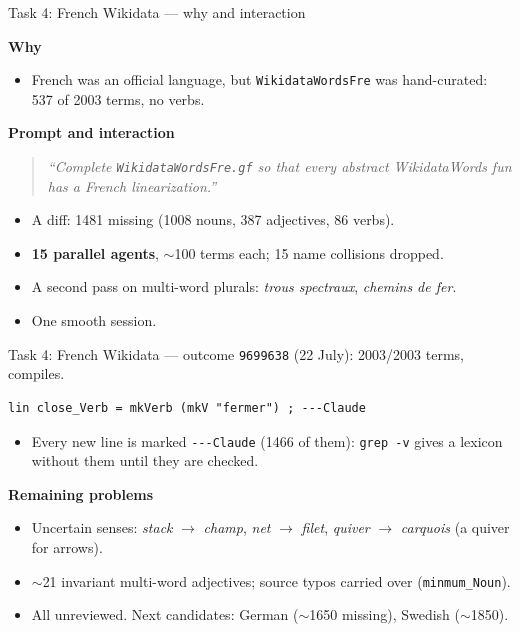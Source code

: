 \documentclass[10pt,aspectratio=169]{beamer}
\newcommand{\bad}[1]{\textcolor{warn}{#1}}
\newcommand{\commit}[1]{\texttt{\footnotesize #1}}
\newcommand{\prompt}[1]{\begin{quote}\small\itshape ``#1''\end{quote}}
\newcommand{\why}{\par\textcolor{gfblue}{\textbf{Why}}\par}
\newcommand{\how}{\par\textcolor{gfblue}{\textbf{Prompt and interaction}}\par}
\begin{document}
\begin{frame}{Task 4: French Wikidata --- why and interaction}
  \why
  \begin{itemize}\small
    \item French was an official language, but \texttt{WikidataWordsFre} was
          hand-curated: 537 of 2003 terms, no verbs.
  \end{itemize}
  \how
  \prompt{Complete \texttt{WikidataWordsFre.gf} so that every abstract
    WikidataWords fun has a French linearization.}
  \begin{itemize}\small
    \item A diff: 1481 missing (1008 nouns, 387 adjectives, 86 verbs).
    \item \textbf{15 parallel agents}, $\sim$100 terms each; 15 name collisions dropped.
    \item A second pass on multi-word plurals: \emph{trous spectraux},
          \emph{chemins de fer}.
    \item One smooth session.
  \end{itemize}
\end{frame}

\begin{frame}[fragile]{Task 4: French Wikidata --- outcome}
  \commit{9699638} (22 July): 2003/2003 terms, compiles.
\begin{lstlisting}
lin close_Verb = mkVerb (mkV "fermer") ; ---Claude
\end{lstlisting}
  \begin{itemize}\small
    \item Every new line is marked \texttt{-{}-{}-Claude} (1466 of them):
          \texttt{grep -v} gives a lexicon without them until they are checked.
  \end{itemize}
  \textbf{Remaining problems}
  \begin{itemize}\small
    \item Uncertain senses: \emph{stack} $\to$ \emph{champ}, \emph{net} $\to$ \emph{filet},
          \bad{\emph{quiver} $\to$ \emph{carquois}} (a quiver for arrows).
    \item $\sim$21 invariant multi-word adjectives; source typos carried over
          (\texttt{minmum\_Noun}).
    \item All unreviewed. Next candidates: German ($\sim$1650 missing),
          Swedish ($\sim$1850).
  \end{itemize}
\end{frame}

\end{document}
